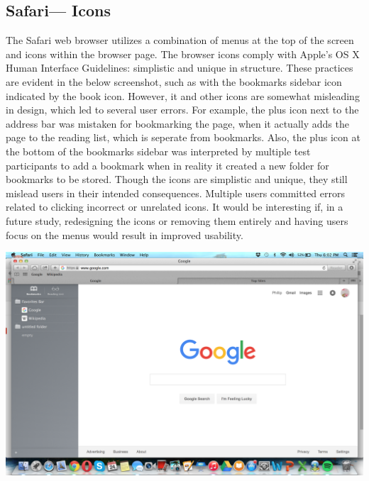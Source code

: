\documentclass{article}
\begin{document}
\subsection{Safari--- Icons} The Safari web browser utilizes a combination of menus at the top of the screen and icons within the browser page. The browser icons comply with Apple's OS X Human Interface Guidelines: simplistic and unique in structure\cite{Apple}. These practices are evident in the below screenshot, such as with the bookmarks sidebar icon indicated by the book icon. However, it and other icons are somewhat misleading in design, which led to several user errors. For example, the plus icon next to the address bar was mistaken for bookmarking the page, when it actually adds the page to the reading list, which is seperate from bookmarks. \clearpage \noindent Also, the plus icon at the bottom of the bookmarks sidebar was interpreted by multiple test participants to add a bookmark when in reality it created a new folder for bookmarks to be stored. Though the icons are simplistic and unique, they still mislead users in their intended consequences. Multiple users committed errors related to clicking incorrect or unrelated icons. It would be interesting if, in a future study, redesigning the icons or removing them entirely and having users focus on the menus would result in improved usability.
\begin{center}
\includegraphics[width=1\textwidth]{Safari_Bookmark.png}
\end{center}
\end{document}
